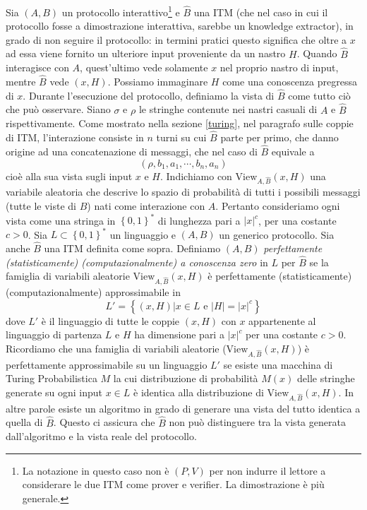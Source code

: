 \documentclass{article}
\theoremstyle{definition}
\begin{document}
Sia $(A, B)$ un protocollo interattivo\footnote{La notazione in questo caso non è $(P, V)$ per non indurre il lettore a considerare le due ITM come prover e verifier. La dimostrazione è più generale.} e $\hat{B}$ una ITM (che nel caso in cui il protocollo fosse a dimostrazione interattiva, sarebbe un knowledge extractor), in grado di non seguire il protocollo: in termini pratici questo significa che oltre a $x$ ad essa viene fornito un ulteriore input proveniente da un nastro $H$.
Quando $\hat{B}$ interagisce con $A$, quest'ultimo vede solamente $x$ nel proprio nastro di input, mentre $\hat{B}$ vede $(x, H)$. Possiamo immaginare $H$ come una conoscenza pregressa di $x$. 
Durante l'esecuzione del protocollo, definiamo la vista di $\hat{B}$ come tutto ciò che può osservare. Siano $\sigma$ e $\rho$ le stringhe contenute nei nastri casuali di $A$ e $\hat{B}$ rispettivamente. Come mostrato nella sezione \ref{turing}, nel paragrafo sulle coppie di ITM, l'interazione consiste in $n$ turni su cui $\hat{B}$ parte per primo, che danno origine ad una concatenazione di messaggi, che nel caso di $\hat{B}$ equivale a 
\begin{equation*}
    (\rho, b_1, a_1, \cdots, b_n, a_n) 
\end{equation*}
cioè alla sua vista sugli input $x$ e $H$.
Indichiamo con $\text{View}_{A, \hat{B}}(x, H)$ una variabile aleatoria che descrive lo spazio di probabilità di tutti i possibili messaggi (tutte le viste di $\hat{B}$) nati come interazione con $A$.  
Pertanto consideriamo ogni vista come una stringa in $\left\{ 0,1 \right\}^*$ di lunghezza pari a $|x|^c$, per una costante $c > 0$.
Sia $L \subset \left\{ 0,1 \right\}^*$ un linguaggio e $(A, B)$ un generico protocollo. Sia anche $\hat{B}$ una ITM definita come sopra. Definiamo $(A,B)$ \emph{perfettamente (statisticamente) (computazionalmente) a conoscenza zero} in $L$ per $\hat{B}$ se la famiglia di variabili aleatorie $\text{View}_{A, \hat{B}}(x, H)$ è perfettamente (statisticamente) (computazionalmente) approssimabile in
\begin{equation*}
    L' = \left\{ (x, H) | x \in L \text{ e } |H| = |x|^c \right\}
\end{equation*}
dove $L'$ è il linguaggio di tutte le coppie $(x, H)$ con $x$ appartenente al linguaggio di partenza $L$ e $H$ ha dimensione pari a $|x|^c$ per una costante $c > 0$.
Ricordiamo che una famiglia di variabili aleatorie ($\text{View}_{A, \hat{B}}(x, H)$) è perfettamente approssimabile su un linguaggio $L'$ se esiste una macchina di Turing Probabilistica $M$ la cui distribuzione di probabilità $M(x)$ delle stringhe generate su ogni input $x \in L$ è identica alla distribuzione di $\text{View}_{A, \hat{B}}(x, H)$. In altre parole esiste un algoritmo in grado di generare una vista del tutto identica a quella di $\hat{B}$.
Questo ci assicura che $\hat{B}$ non può distinguere tra la vista generata dall'algoritmo e la vista reale del protocollo.
\end{document}
